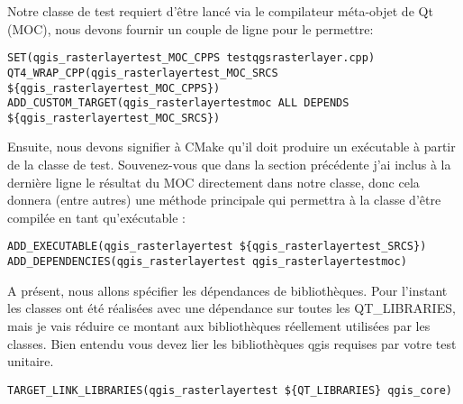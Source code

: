 Notre classe de test requiert d'\^etre lanc\'e via le compilateur m\'eta-objet de Qt (MOC), nous devons fournir un couple de ligne pour le permettre:

\begin{verbatim}
SET(qgis_rasterlayertest_MOC_CPPS testqgsrasterlayer.cpp)
QT4_WRAP_CPP(qgis_rasterlayertest_MOC_SRCS ${qgis_rasterlayertest_MOC_CPPS})
ADD_CUSTOM_TARGET(qgis_rasterlayertestmoc ALL DEPENDS ${qgis_rasterlayertest_MOC_SRCS})
\end{verbatim}

Ensuite, nous devons signifier \`a CMake qu'il doit produire un ex\'ecutable \`a partir de la classe de test. Souvenez-vous que dans la section pr\'ec\'edente j'ai inclus \`a la derni\`ere ligne le r\'esultat du MOC directement dans notre classe, donc cela donnera (entre autres) une m\'ethode principale qui permettra \`a la classe d'\^etre compil\'ee en tant qu'ex\'ecutable :

\begin{verbatim}
ADD_EXECUTABLE(qgis_rasterlayertest ${qgis_rasterlayertest_SRCS})
ADD_DEPENDENCIES(qgis_rasterlayertest qgis_rasterlayertestmoc)
\end{verbatim}

A pr\'esent, nous allons sp\'ecifier les d\'ependances de biblioth\`eques. Pour l'instant les classes ont \'et\'e r\'ealis\'ees avec une d\'ependance sur toutes les QT\_LIBRARIES, mais je vais r\'eduire ce montant aux biblioth\`eques r\'eellement utilis\'ees par les classes. Bien entendu vous devez lier les biblioth\`eques qgis requises par votre test unitaire.

\begin{verbatim}
TARGET_LINK_LIBRARIES(qgis_rasterlayertest ${QT_LIBRARIES} qgis_core)
\end{verbatim}

